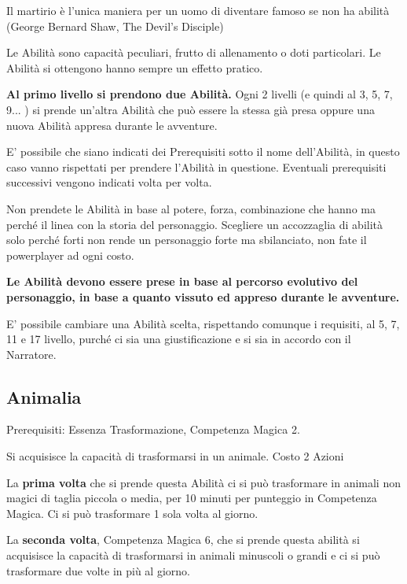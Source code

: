 \documentclass[a4paper,11pt,twoside,openany]{book}
\begin{document}
\label{abilita}
\begin{tcolorbox}[enhanced,arc=5pt,boxrule=0.3pt]{Il martirio è l'unica maniera per un uomo di diventare famoso se non ha abilità (George Bernard Shaw, The Devil's Disciple)} \end{tcolorbox}\medskip

Le Abilità sono capacità peculiari, frutto di allenamento o doti particolari. Le Abilità si ottengono hanno sempre un effetto pratico.

\textbf{Al primo livello si prendono due Abilità.} Ogni 2 livelli (e quindi al 3, 5, 7, 9... ) si prende un'altra Abilità che può essere la stessa già presa oppure una nuova Abilità appresa durante le avventure.

E' possibile che siano indicati dei Prerequisiti sotto il nome dell'Abilità, in questo caso vanno rispettati per prendere l'Abilità in questione.
Eventuali prerequisiti successivi vengono indicati volta per volta.

Non prendete le Abilità in base al potere, forza, combinazione che hanno ma perché il linea con la storia del personaggio.
Scegliere un accozzaglia di abilità solo perché forti non rende un personaggio forte ma sbilanciato, non fate il powerplayer ad ogni costo.

\medskip
\textbf{Le Abilità devono essere prese in base al percorso evolutivo del personaggio, in base a quanto vissuto ed appreso durante le avventure.}
\medskip

E' possibile cambiare una Abilità scelta, rispettando comunque i requisiti, al 5, 7, 11 e 17 livello, purché ci sia una giustificazione e si sia in accordo con il Narratore.

\subsection{Animalia}

Prerequisiti: Essenza Trasformazione, Competenza Magica 2.

Si acquisisce la capacità di trasformarsi in un animale. Costo 2 Azioni

La \textbf{prima volta} che si prende questa Abilità ci si può trasformare in animali non magici di taglia piccola o media, per 10 minuti per punteggio in Competenza Magica. Ci si può trasformare 1 sola volta al giorno.

La \textbf{seconda volta}, Competenza Magica 6, che si prende questa abilità si acquisisce la capacità di trasformarsi in animali minuscoli o grandi e ci si può trasformare due volte in più al giorno.
\end{document}
